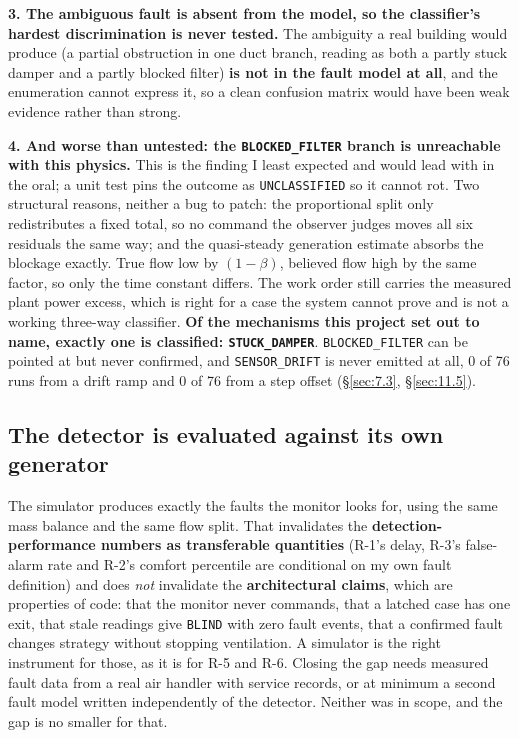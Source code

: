 \textbf{3. The ambiguous fault is absent from the model, so the classifier's hardest discrimination
is never tested.} The ambiguity a real building would produce (a partial obstruction in one duct
branch, reading as both a partly stuck damper and a partly blocked filter) \textbf{is not in the
fault model at all}, and the enumeration cannot express it, so a clean confusion matrix would have
been weak evidence rather than strong.

\textbf{4. And worse than untested: the \texttt{BLOCKED\_FILTER} branch is unreachable with this
physics.} This is the finding I least expected and would lead with in the oral; a unit test pins the
outcome as \texttt{UNCLASSIFIED} so it cannot rot. Two structural reasons, neither a bug to patch:
the proportional split only redistributes a fixed total, so no command the observer judges moves all
six residuals the same way; and the quasi-steady generation estimate absorbs the blockage exactly.
True flow low by $(1-\beta)$, believed flow high by the same factor, so only the time constant
differs. The work order still carries the measured plant power excess, which is right for a case the
system cannot prove and is not a working three-way classifier. \textbf{Of the mechanisms this project
set out to name, exactly one is classified: \texttt{STUCK\_DAMPER}}. \texttt{BLOCKED\_FILTER} can
be pointed at but never confirmed, and \texttt{SENSOR\_DRIFT} is never emitted at all, 0 of 76 runs
from a drift ramp and 0 of 76 from a step offset (§\ref{sec:7.3}, §\ref{sec:11.5}).

\subsection{The detector is evaluated against its own generator}\label{sec:13.2}

The simulator produces exactly the faults the monitor looks for, using the same mass balance and the
same flow split. That invalidates the \textbf{detection-performance numbers as transferable
quantities} (R-1's delay, R-3's false-alarm rate and R-2's comfort percentile are conditional on my
own fault definition) and does \emph{not} invalidate the \textbf{architectural claims}, which are
properties of code: that the monitor never commands, that a latched case has one exit, that stale
readings give \texttt{BLIND} with zero fault events, that a confirmed fault changes strategy without
stopping ventilation. A simulator is the right instrument for those, as it is for R-5 and R-6. Closing
the gap needs measured fault data from a real air handler with service records, or at minimum a second
fault model written independently of the detector. Neither was in scope, and the gap is no smaller for
that.

